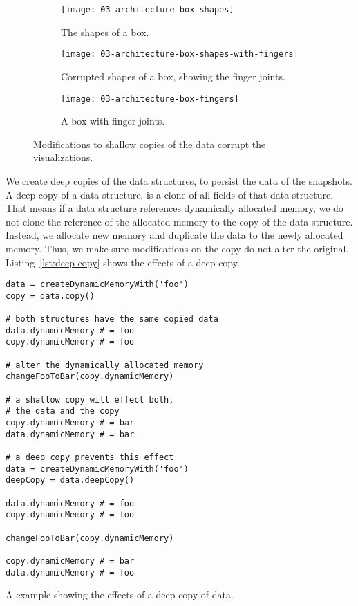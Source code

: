 \documentclass[../03-Architecture.tex]{subfiles}
\begin{document}
\begin{figure}[h]
  \centering
  \begin{subfigure}[a]{0.3222\textwidth}
    \texttt{[image: 03-architecture-box-shapes]}
    \caption{The shapes of a box.}
    \label{fig:corrupt:shapes}
  \end{subfigure}
  \begin{subfigure}[b]{0.3222\textwidth}
    \texttt{[image: 03-architecture-box-shapes-with-fingers]}
    \caption{Corrupted shapes of a box, showing the finger joints.}
    \label{fig:corrupt:shapes-fingers}
  \end{subfigure}
  \begin{subfigure}[c]{0.3222\textwidth}
    \texttt{[image: 03-architecture-box-fingers]}
    \caption{A box with finger joints.}
    \label{fig:corrupt:fingers}
  \end{subfigure}
  \caption{Modifications to shallow copies of the data
    corrupt the visualizations.}
  \label{fig:corrupt}
\end{figure}

We create deep copies of the data structures, to persist the
data of the snapshots. A deep copy of a data structure, is a
clone of all fields of that data structure. That means if a
data structure references dynamically allocated memory, we
do not clone the reference of the allocated memory to the
copy of the data structure. Instead, we allocate new memory
and duplicate the data to the newly allocated memory. Thus,
we make sure modifications on the copy do not alter the
original. Listing~\ref{lst:deep-copy} shows the effects of a
deep copy.

\begin{listing}[h]
\begin{verbatim}
data = createDynamicMemoryWith('foo')
copy = data.copy()

# both structures have the same copied data
data.dynamicMemory # = foo
copy.dynamicMemory # = foo

# alter the dynamically allocated memory
changeFooToBar(copy.dynamicMemory)

# a shallow copy will effect both,
# the data and the copy
copy.dynamicMemory # = bar
data.dynamicMemory # = bar

# a deep copy prevents this effect
data = createDynamicMemoryWith('foo')
deepCopy = data.deepCopy()

data.dynamicMemory # = foo
copy.dynamicMemory # = foo

changeFooToBar(copy.dynamicMemory)

copy.dynamicMemory # = bar
data.dynamicMemory # = foo
\end{verbatim}
\caption{A {\coffeescript} example showing the effects of a deep copy
  of data.}
\label{lst:deep-copy}
\end{listing}
\end{document}
